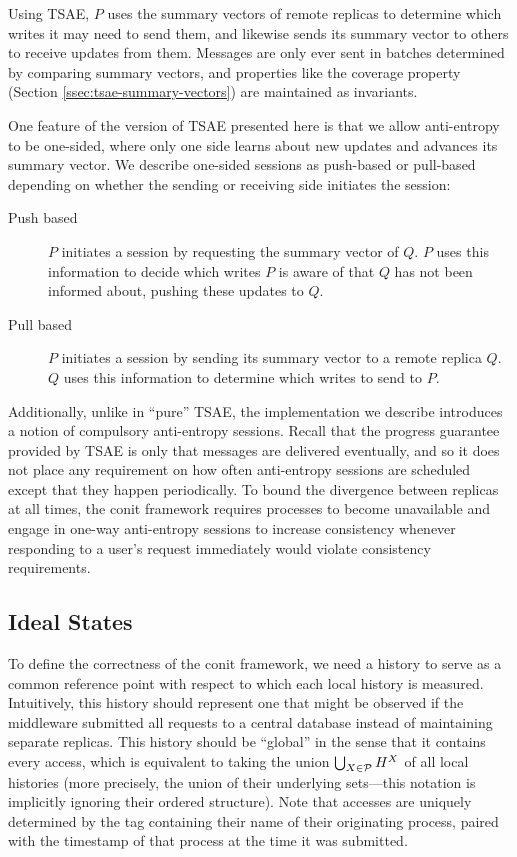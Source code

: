 \documentclass[]             %
{NASA}                       %
\theoremstyle{definition}
\begin{document}
Using TSAE, $P$ uses the summary vectors of remote replicas to
determine which writes it may need to send them, and likewise sends
its summary vector to others to receive updates from them. Messages
are only ever sent in batches determined by comparing summary vectors,
and properties like the coverage property (Section
\ref{ssec:tsae-summary-vectors}) are maintained as invariants.

One feature of the version of TSAE presented here is that we allow
anti-entropy to be one-sided, where only one side learns about new
updates and advances its summary vector. We describe one-sided
sessions as push-based or pull-based depending on whether the sending
or receiving side initiates the session:
\begin{description}
\item[Push based] $P$ initiates a session by requesting the summary
  vector of $Q$. $P$ uses this information to decide which writes $P$
  is aware of that $Q$ has not been informed about, pushing these
  updates to $Q$.
\item[Pull based] $P$ initiates a session by sending its summary
  vector to a remote replica $Q$. $Q$ uses this information to
  determine which writes to send to $P$.
\end{description}

Additionally, unlike in ``pure'' TSAE, the implementation we describe
introduces a notion of compulsory anti-entropy sessions. Recall that
the progress guarantee provided by TSAE is only that messages are
delivered eventually, and so it does not place any requirement on how
often anti-entropy sessions are scheduled except that they happen
periodically. To bound the divergence between replicas at all times,
the conit framework requires processes to become unavailable and
engage in one-way anti-entropy sessions to increase consistency
whenever responding to a user's request immediately would violate
consistency requirements.

\subsection{Ideal States}
\label{ssec:conit-ideal-history}
To define the correctness of the conit framework, we need a history to
serve as a common reference point with respect to which each local
history is measured. Intuitively, this history should represent one
that might be observed if the middleware submitted all requests to a
central database instead of maintaining separate replicas. This
history should be ``global'' in the sense that it contains every
access, which is equivalent to taking the union
$\bigcup_{X \in \mathcal{P}} H^{X}$ of all local histories
(more precisely, the union of their underlying sets---this notation is
implicitly ignoring their ordered structure). Note that accesses are
uniquely determined by the tag containing their name of their
originating process, paired with the timestamp of that process at the
time it was submitted.
\end{document}

